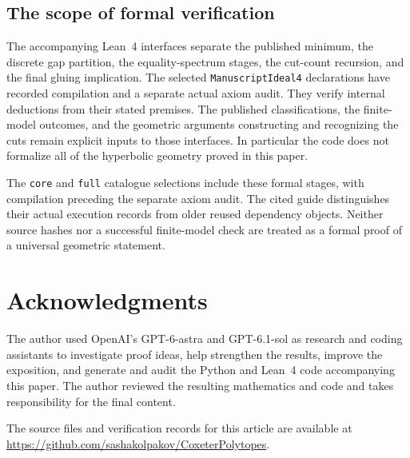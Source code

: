 \documentclass[11pt]{article}
\theoremstyle{remark}
\begin{document}
\subsection{The scope of formal verification}

The accompanying Lean~4 interfaces separate the published minimum,
the discrete gap partition, the equality-spectrum stages, the
cut-count recursion, and the final gluing implication. The selected
\texttt{ManuscriptIdeal4} declarations have recorded compilation
and a separate actual axiom audit. They verify internal deductions
from their stated premises. The published classifications, the
finite-model outcomes, and the geometric arguments constructing
and recognizing the cuts remain explicit inputs to those
interfaces. In particular the code does not formalize all of the
hyperbolic geometry proved in this paper.

The \texttt{core} and \texttt{full} catalogue selections include
these formal stages, with compilation preceding the separate
axiom audit. The cited guide distinguishes their actual execution
records from older reused dependency objects. Neither source
hashes nor a successful finite-model check are treated as a formal
proof of a universal geometric statement.

\section*{Acknowledgments}
The author used OpenAI's GPT-6-astra and GPT-6.1-sol as research and coding
assistants to investigate proof ideas, help strengthen the results, improve
the exposition, and generate and audit the Python and Lean~4 code
accompanying this paper. The author reviewed the resulting mathematics
and code and takes responsibility for the final content.

\medskip
\noindent
The source files and verification records for this article are available at
\url{https://github.com/sashakolpakov/CoxeterPolytopes}.
\end{document}
